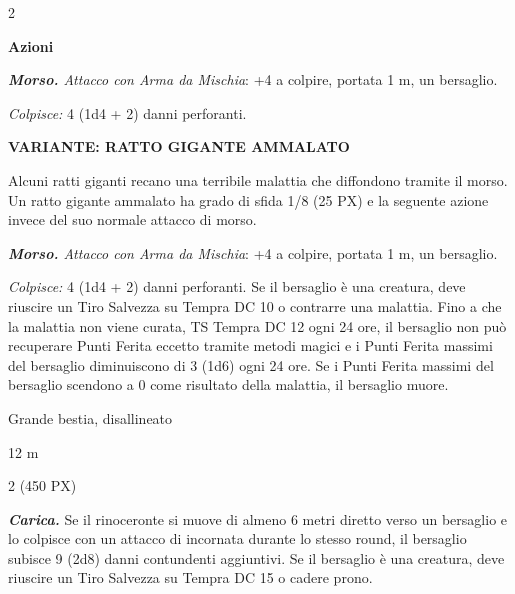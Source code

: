 \begin{multicols}{2}
{\textbf{Azioni}

\emph{\textbf{Morso.} Attacco con Arma da Mischia}: +4 a colpire, portata 1 m, un bersaglio.

\emph{Colpisce:} 4 (1d4 + 2) danni perforanti.

\medskip

\textbf{VARIANTE: RATTO GIGANTE AMMALATO}
\hypertarget{Ratto Gigante ammalato}{}

Alcuni ratti giganti recano una terribile malattia che diffondono tramite il morso. Un ratto gigante ammalato ha grado di sfida 1/8 (25 PX) e la seguente azione invece del suo normale attacco di morso.

\emph{\textbf{Morso.} Attacco con Arma da Mischia}: +4 a colpire, portata 1 m, un bersaglio.

\emph{Colpisce:} 4 (1d4 + 2) danni perforanti. Se il bersaglio è una creatura, deve riuscire un Tiro Salvezza su Tempra DC 10 o contrarre una malattia. Fino a che la malattia non viene curata, TS Tempra DC 12 ogni 24 ore, il bersaglio non può recuperare Punti Ferita eccetto tramite metodi magici e i Punti Ferita massimi del bersaglio diminuiscono di 3 (1d6) ogni 24 ore. Se i Punti Ferita massimi del bersaglio scendono a 0 come risultato della malattia, il bersaglio muore.

\begin{description}[noitemsep, topsep=0pt, parsep=0pt, partopsep=0pt, itemsep=1pt, leftmargin=2.35cm,  labelwidth=2.2cm, itemindent=0cm, listparindent=0pt] %
\setlength{\baselineskip}{10pt}
\item[\textbf{Taglia/Tipo}] Grande bestia, disallineato
\item[\textbf{Caratt.}] 
\item[\textbf{Punti Ferita}] 
\item[\textbf{Tiri Salvez.}] 
\item[\textbf{Movimento}] 12 m
\item[\textbf{Sfida}] 2 (450 PX)
\end{description}
\smallskip

\emph{\textbf{Carica.}} Se il rinoceronte si muove di almeno 6 metri diretto verso un bersaglio e lo colpisce con un attacco di incornata durante lo stesso round, il bersaglio subisce 9 (2d8) danni contundenti aggiuntivi. Se il bersaglio è una creatura, deve riuscire un Tiro Salvezza su Tempra DC 15 o cadere prono.

}
\end{multicols}
